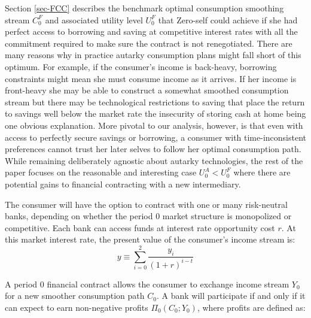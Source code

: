 \documentclass[11pt,english]{article}
\theoremstyle{plain}
\theoremstyle{definition}
\begin{document}
Section \ref{sec-FCC} describes the benchmark optimal consumption
smoothing stream $C_{0}^{F}$ and associated utility level $U_{0}^{F}$
that Zero-self could achieve if she had perfect access to borrowing
and saving at competitive interest rates with all the commitment
required to make sure the contract is not renegotiated. There are
many reasons why in practice autarky consumption plans might fall
short of this optimum. For example, if the consumer's income is back-heavy,
borrowing constraints might mean she must consume income as it arrives.
If her income is front-heavy she may be able to construct a somewhat
smoothed consumption stream but there may be technological restrictions
to saving that place the return to savings well below the market rate
\textendash{} the insecurity of storing cash at home being one obvious
explanation. More pivotal to our analysis, however, is that even with
access to perfectly secure savings or borrowing, a consumer with time-inconsistent
preferences cannot trust her later selves to follow her optimal consumption
path. While remaining deliberately agnostic about autarky technologies,
the rest of the paper focuses on the reasonable and interesting case
$U_{0}^{A}<U_{0}^{F}$ where there are potential gains to financial
contracting with a new intermediary.

The consumer will have the option to contract with one or many risk-neutral
banks, depending on whether the period 0 market structure is monopolized
or competitive. Each bank can access funds at interest rate opportunity
cost $r$. At this market interest rate, the present value of the
consumer's income stream is: 
\begin{equation}
y\equiv\sum\limits _{i=0}^{2}\frac{y_{i}}{\left(1+r\right)^{i-t}}
\end{equation}

A period 0 financial contract allows the consumer to exchange income
stream $Y_{0}$ for a new smoother consumption path $C_{0}$. A bank
will participate if and only if it can expect to earn non-negative
profits $\Pi_{0}(C_{0};Y_{0})$, where profits are defined as:
\end{document}
